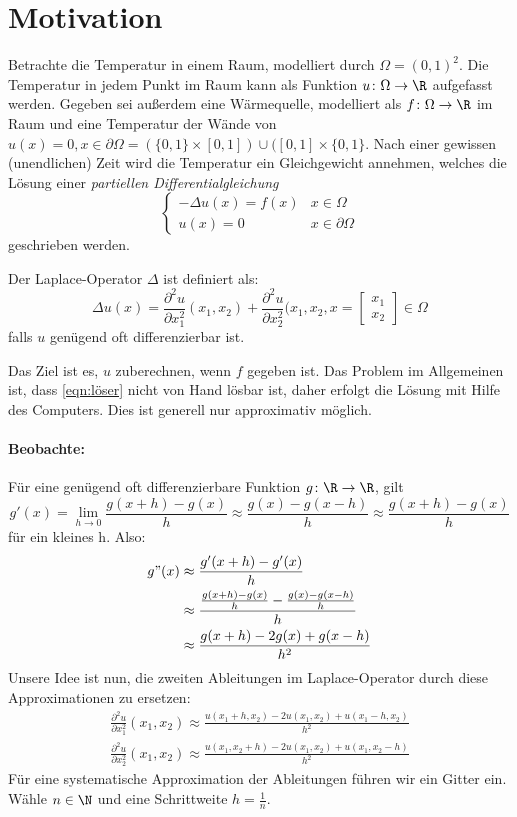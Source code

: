 \section*{Motivation}
Betrachte die Temperatur in einem Raum, modelliert durch $\Omega = (0,1)^2$.
Die Temperatur in jedem Punkt im Raum kann als Funktion $u \colon \Omega \to \R $ aufgefasst werden.
Gegeben sei außerdem eine Wärmequelle, modelliert als $f \colon \Omega \to \R $  im Raum und eine Temperatur der Wände von $u(x)=0, x \in \partial \Omega = (\{0,1\} \times [0,1] ) \cup ([0,1] \times \{0,1\} $.
Nach einer gewissen (unendlichen) Zeit wird die Temperatur ein Gleichgewicht annehmen, welches die Lösung einer \emph{partiellen Differentialgleichung}
\begin{equation}
	\label{eqn:löser}
\begin{cases}
	-\Delta u(x) = f(x) & x \in \Omega \\
	u(x) = 0 & x \in \partial \Omega
\end{cases}
\end{equation}
geschrieben werden.
\begin{definition}
Der Laplace-Operator $\Delta$ ist definiert als: 
\[
\Delta u(x) = \frac{\partial^2 u}{\partial x_1^2}(x_1,x_2) + \frac{\partial^2 u}{\partial x_2^2}(x_1,x_2 , x = \begin{bmatrix}
x_1 \\ x_{2} 
\end{bmatrix} \in \Omega
\]
falls $u$ genügend oft differenzierbar ist.
\end{definition}
Das Ziel ist es, $u$ zuberechnen, wenn $f$ gegeben ist. Das Problem im Allgemeinen ist, dass \eqref{eqn:löser} nicht von Hand lösbar ist, daher erfolgt die Lösung mit Hilfe des Computers. Dies ist generell nur approximativ möglich.
\paragraph{Beobachte:} Für eine genügend oft differenzierbare Funktion $g \colon \R \to \R $, gilt 
\[
g'(x)= \lim_{h \to 0} \frac{g(x+h)-g(x)}{h} \approx \frac{g(x)-g(x-h)}{h} \approx \frac{g(x+h)-g(x)}{h}
\]
für ein kleines h. Also:
\begin{align*}
	g"(x) &\approx \frac{g'(x+h)-g'(x)}{h} \\
	      &\approx \frac{\frac{g(x+h)-g(x)}{h}-\frac{g(x)-g(x-h)}{h}}{h} \\
	      &\approx \frac{g(x+h)-2g(x)+g(x-h)}{h^2}
\end{align*}
Unsere Idee ist nun, die zweiten Ableitungen im Laplace-Operator durch diese Approximationen zu ersetzen:
\begin{align*}
\frac{\partial^2 u}{\partial x_{1}^2}(x_1,x_2) \approx \frac{u(x_1+h,x_2) - 2u(x_1,x_2) + u(x_1-h,x_2)}{h^2} \\
\frac{\partial^2 u}{\partial x_{2}^2}(x_1,x_2) \approx \frac{u(x_1,x_2+h) - 2u(x_1,x_2) + u(x_1,x_2-h)}{h^2}
\end{align*}
Für eine systematische Approximation der Ableitungen führen wir ein Gitter ein. Wähle $n \in \N$ und eine Schrittweite $h=\frac{1}{n}$.

